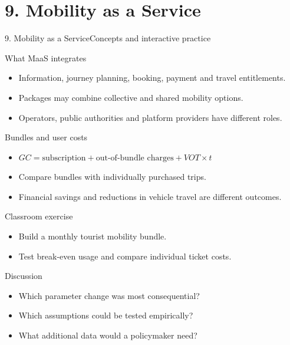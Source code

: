 \documentclass[aspectratio=169,11pt]{beamer}
\begin{document}
\section{9. Mobility as a Service}
\begin{frame}{9. Mobility as a Service}\centering\Large Concepts and interactive practice\end{frame}
\begin{frame}{What MaaS integrates}\begin{itemize}
\item Information, journey planning, booking, payment and travel entitlements.
\item Packages may combine collective and shared mobility options.
\item Operators, public authorities and platform providers have different roles.
\end{itemize}\end{frame}
\begin{frame}{Bundles and user costs}\begin{itemize}
\item $GC=\text{subscription}+\text{out-of-bundle charges}+VOT\times t$
\item Compare bundles with individually purchased trips.
\item Financial savings and reductions in vehicle travel are different outcomes.
\end{itemize}\end{frame}
\begin{frame}{Classroom exercise}\begin{itemize}
\item Build a monthly tourist mobility bundle.
\item Test break-even usage and compare individual ticket costs.
\end{itemize}\end{frame}
\begin{frame}{Discussion}\begin{itemize}\item Which parameter change was most consequential?\item Which assumptions could be tested empirically?\item What additional data would a policymaker need?\end{itemize}\end{frame}
\end{document}
